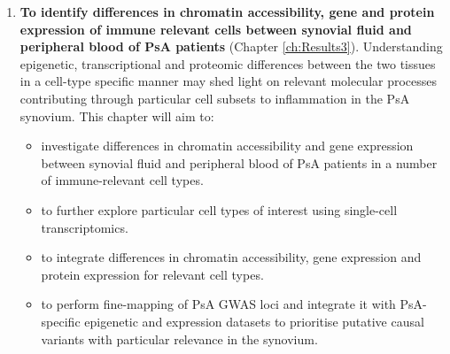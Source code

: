 \begin{enumerate}
\item \textbf{To identify differences in chromatin accessibility, gene and protein expression of immune relevant cells between synovial fluid and peripheral blood of PsA patients} (Chapter \ref{ch:Results3}). Understanding epigenetic, transcriptional and proteomic differences between the two tissues in a cell-type specific manner may shed light on relevant molecular processes contributing through particular cell subsets to inflammation in the PsA synovium. This chapter will aim to:

\begin{itemize}
	\item investigate differences in chromatin accessibility and gene expression between synovial fluid and peripheral blood of PsA patients in a number of immune-relevant cell types.
	\item to further explore particular cell types of interest using single-cell transcriptomics.
	\item to integrate differences in chromatin accessibility, gene expression and protein expression for relevant cell types.
	\item to perform fine-mapping of PsA GWAS loci and integrate it with PsA-specific epigenetic and expression datasets to prioritise putative causal variants with particular relevance in the synovium.
\end{itemize}

\end{enumerate}
%
%
